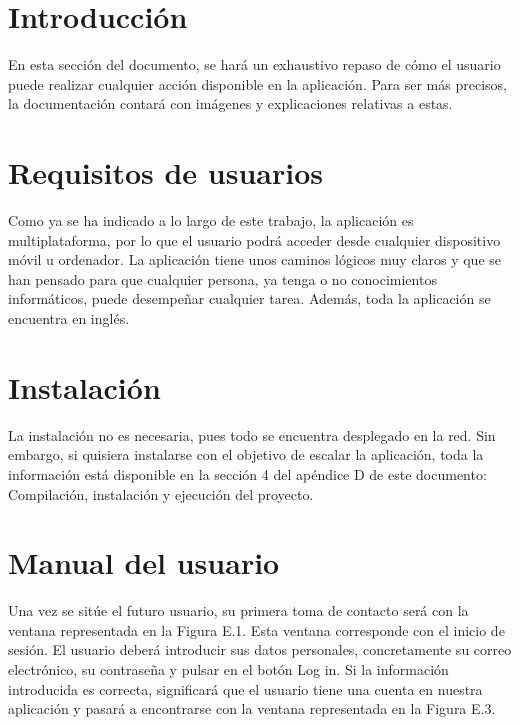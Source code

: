 
\section{Introducción}

	En esta sección del documento, se hará un exhaustivo repaso de cómo el usuario puede realizar cualquier acción disponible en la aplicación. Para ser más precisos, la documentación contará con imágenes y explicaciones relativas a estas.

\section{Requisitos de usuarios}

	Como ya se ha indicado a lo largo de este trabajo, la aplicación es multiplataforma, por lo que el usuario podrá acceder desde cualquier dispositivo móvil u ordenador. La aplicación tiene unos caminos lógicos muy claros y que se han pensado para que cualquier persona, ya tenga o no conocimientos informáticos, puede desempeñar cualquier tarea. Además, toda la aplicación se encuentra en inglés.

\section{Instalación}

	La instalación no es necesaria, pues todo se encuentra desplegado en la red. Sin embargo, si quisiera instalarse con el objetivo de escalar la aplicación, toda la información está disponible en la sección 4 del apéndice D de este documento: Compilación, instalación y ejecución del proyecto.

\section{Manual del usuario}

	Una vez se sitúe el futuro usuario, su primera toma de contacto será con la ventana representada en la Figura E.1. Esta ventana corresponde con el inicio de sesión. El usuario deberá introducir sus datos personales, concretamente su correo electrónico, su contraseña y pulsar en el botón Log in. Si la información introducida es correcta, significará que el usuario tiene una cuenta en nuestra aplicación y pasará a encontrarse con la ventana representada en la Figura E.3.
	
	
